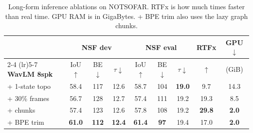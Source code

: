 \begin{table}[t]
\centering
\caption{Long-form inference ablations on NOTSOFAR. RTFx is how much times faster than real time. GPU RAM is in GigaBytes. + BPE trim also uses the lazy graph chunks.}
\label{tab:longform_ablation}
\setlength{\tabcolsep}{1.1pt}
\renewcommand{\arraystretch}{0.92}

\begin{tabular}{@{}l|ccc|ccc|c|c@{}}
\toprule
& \multicolumn{3}{c|}{\textbf{NSF dev}}
& \multicolumn{3}{c|}{\textbf{NSF eval}}
& \textbf{RTFx}
& \textbf{GPU $\downarrow$} \\
\cmidrule(lr){2-4}
\cmidrule(lr){5-7}
\textbf{WavLM 8spk}
& IoU$\uparrow$ & BE$\downarrow$ & $\tau\downarrow$
& IoU$\uparrow$ & BE$\downarrow$ & $\tau\downarrow$
& $\uparrow$ & (GiB) \\
\midrule

+ 1-state topo
& 58.4
& 117
& 12.6
& 58.7
& 104
& \textbf{19.0}
& 9.7 & 14.3 \\

\quad + 30\% frames
& 56.7
& 128
& 12.7
& 57.4
& 111
& 19.2
& 19.3 & 8.5 \\

\qquad + chunks
& 57.4
& 123
& 12.6
& 57.8
& 108
& 19.2
& \textbf{29.8} & \textbf{2.0} \\

\quad + BPE trim
& \textbf{61.0}
& \textbf{112}
& \textbf{12.4}
& \textbf{61.4}
& \textbf{97}
& 19.4
& 17.0 & \textbf{2.0} \\

\bottomrule
\end{tabular}
\vspace{-5mm}
\end{table}
